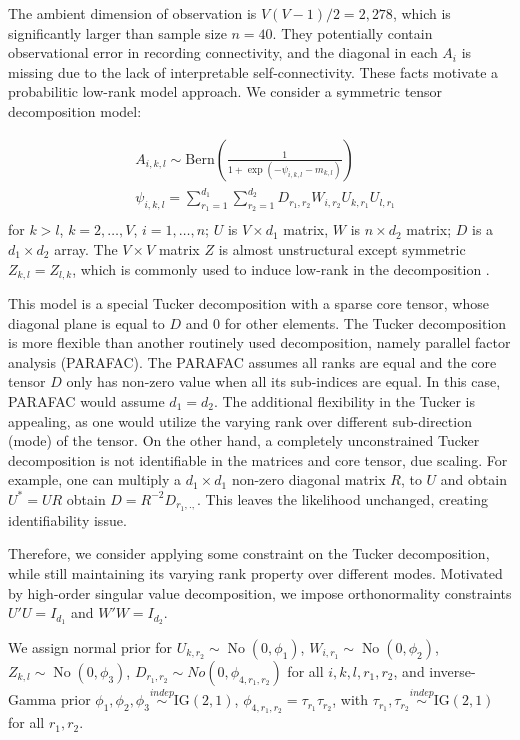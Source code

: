 \documentclass[10pt]{article}
\DeclareMathOperator{\No}{No}
\DeclareMathOperator{\1}{\mathbbm{1}}
\begin{document}
The ambient dimension of observation is $V(V-1)/2=2,278$, which is significantly larger than sample size $n=40$. They potentially contain observational error in recording connectivity, and the  diagonal in each $A_{i}$ is missing due to the lack of interpretable self-connectivity. These facts motivate a probabilitic low-rank model approach. We consider a symmetric tensor decomposition model:

\begin{equation*}
\begin{aligned}
& A_{i,k,l} \sim \text{Bern}( \frac{1}{1+ \exp(-\psi_{i,k,l}- m_{k,l})})\\
& \psi_{i,k,l} = \sum_{r_1=1}^{d_1}\sum_{r_2=1}^{d_2} D_{r_1,r_2} W_{i,r_2} U_{k,r_1} U_{l,r_1}  \\
\end{aligned}
\end{equation*}
for $k>l$, $k=2,\ldots, V$, $i=1,\ldots,n$; $U$ is $V\times d_1$ matrix, $W$ is $n\times d_2$ matrix; $D$ is a $d_1\times d_2$ array. The  $V\times V$ matrix $Z$ is almost unstructural except symmetric $Z_{k,l}=Z_{l,k}$, which is commonly used to induce low-rank in the decomposition \citep{durante2016nonparametric}.


This model is a special Tucker decomposition with a sparse core tensor, whose diagonal plane is equal to $D$ and $0$ for other elements. The Tucker decomposition is more flexible than another routinely used decomposition, namely parallel factor analysis (PARAFAC). The PARAFAC assumes all ranks are equal and the core tensor $D$ only has non-zero value when all its sub-indices are equal. In this case, PARAFAC would assume $d_1=d_2$. The additional flexibility in the Tucker is appealing, as one would utilize the varying rank over different sub-direction (mode) of the tensor. On the other hand, a completely unconstrained Tucker decomposition is not identifiable in the matrices and core tensor, due scaling. For example, one can multiply a $d_1\times d_1$ non-zero diagonal matrix $R$, to $U$ and obtain $U^*=UR$ obtain $D=R^{-2}D_{r_1,.,}$. This leaves the likelihood unchanged, creating identifiability issue. 

Therefore, we consider applying some constraint on the Tucker decomposition, while still maintaining its varying rank property over different modes. Motivated by high-order singular value decomposition, we impose orthonormality constraints $U'U=I_{d_1}$ and $W'W=I_{d_2}$.

We assign normal prior for $U_{k,r_2}\sim \No(0,\phi_{1})$, $W_{i,r_1}\sim \No(0,\phi_2)$, $Z_{k,l}\sim \No(0,\phi_3)$, $D_{r_1,r_2}\sim No(0, \phi_{4,r_1,r_2})$ for all $i,k,l,r_1,r_2$, and inverse-Gamma prior $\phi_1,\phi_2,\phi_3\stackrel{indep}{\sim} \text{IG}(2,1)$, $\phi_{4,r_1,r_2}= \tau_{r_1}\tau_{r_2}$, with $\tau_{r_1},\tau_{r_2}\stackrel{indep}{\sim} \text{IG}(2,1)$ for all $r_1,r_2$.
\end{document}
